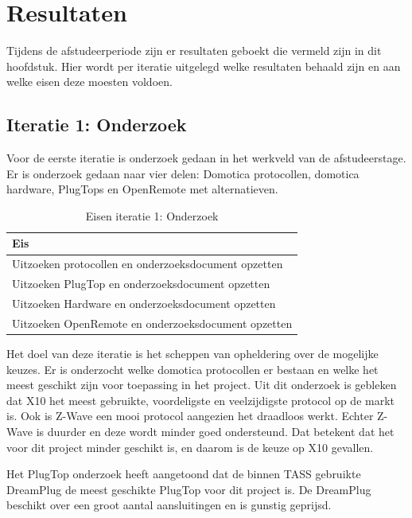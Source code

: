 \documentclass[]{article}
\begin{document}
\newpage
\section{Resultaten}

Tijdens de afstudeerperiode zijn er resultaten geboekt die vermeld zijn in dit
hoofdstuk. Hier wordt per iteratie uitgelegd welke resultaten behaald
zijn en aan welke eisen deze moesten voldoen.

\subsection{Iteratie 1: Onderzoek}
Voor de eerste iteratie is onderzoek gedaan in het werkveld van de afstudeerstage.
Er is onderzoek gedaan naar vier delen: Domotica protocollen, domotica hardware,
PlugTops en OpenRemote met alternatieven. 

\begin{table}[htpb]
  \caption{Eisen iteratie 1: Onderzoek}
  \begin{center}
    \begin{tabular}{|| l ||}\hline
        Eis                                                  \\\hline\hline
        Uitzoeken protocollen en onderzoeksdocument opzetten \\\hline
        Uitzoeken PlugTop en onderzoeksdocument opzetten     \\\hline
        Uitzoeken Hardware en onderzoeksdocument opzetten    \\\hline
        Uitzoeken OpenRemote en onderzoeksdocument opzetten  \\\hline
    \end{tabular}
  \end{center}
\end{table}

Het doel van deze iteratie is het scheppen van opheldering over de mogelijke
keuzes. Er is onderzocht welke domotica protocollen er bestaan en welke het
meest geschikt zijn voor toepassing in het project. Uit dit onderzoek is
gebleken dat X10 het meest gebruikte, voordeligste en veelzijdigste protocol op de markt
is. Ook is Z-Wave een mooi protocol aangezien het draadloos werkt. Echter
Z-Wave is duurder en deze wordt minder goed ondersteund. Dat betekent dat het voor dit
project minder geschikt is, en daarom is de keuze op X10 gevallen.  

Het PlugTop onderzoek heeft aangetoond dat de binnen TASS gebruikte
DreamPlug de meest geschikte PlugTop voor dit project is. De DreamPlug
beschikt over een groot aantal aansluitingen en is gunstig geprijsd. 
\end{document}
